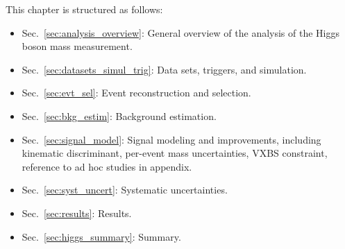 This chapter is structured as follows:
\begin{itemize}                                                                          
    \item Sec.~\ref{sec:analysis_overview}: General overview of the analysis of the Higgs boson mass measurement.
    \item Sec.~\ref{sec:datasets_simul_trig}: Data sets, triggers, and simulation.
    \item Sec.~\ref{sec:evt_sel}: Event reconstruction and selection.
    \item Sec.~\ref{sec:bkg_estim}: Background estimation.
    \item Sec.~\ref{sec:signal_model}: Signal modeling and improvements, including kinematic discriminant, per-event mass uncertainties, VXBS constraint, reference to ad hoc studies in appendix.
    \item Sec.~\ref{sec:syst_uncert}: Systematic uncertainties.
    \item Sec.~\ref{sec:results}: Results.
    \item Sec.~\ref{sec:higgs_summary}: Summary.
\end{itemize}
